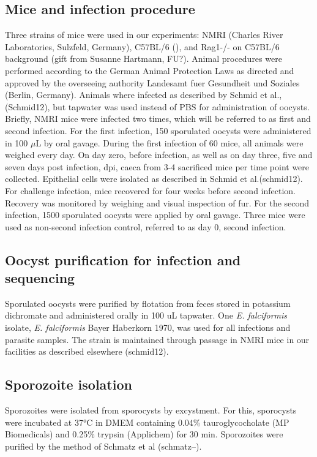 \documentclass{bmcart}
\begin{document}
\subsection{Mice and infection procedure}
Three strains of mice were used in our experiments: NMRI (Charles
River Laboratories, Sulzfeld, Germany), C57BL/6 (), and Rag1-/- on
C57BL/6 background (gift from Susanne Hartmann, FU?).  Animal
procedures were performed according to the German Animal Protection
Laws as directed and approved by the overseeing authority Landesamt
fuer Gesundheit und Soziales (Berlin, Germany). Animals where infected
as described by Schmid et al., (Schmid12), but tapwater was used
instead of PBS for administration of oocysts. Briefly, NMRI mice were
infected two times, which will be referred to as first and second
infection. For the first infection, 150 sporulated oocysts were
administered in 100 $μ$L by oral gavage. During the first infection of
60 mice, all animals were weighed every day. On day zero, before
infection, as well as on day three, five and seven days post
infection, dpi, caeca from 3-4 sacrificed mice per time point were
collected. Epithelial cells were isolated as described in Schmid et
al.(schmid12). For challenge infection, mice recovered for four weeks
before second infection.  Recovery was monitored by weighing and
visual inspection of fur. For the second infection, 1500 sporulated
oocysts were applied by oral gavage. Three mice were used as
non-second infection control, referred to as day 0, second infection.

\subsection{Oocyst purification for infection and sequencing}
Sporulated oocysts were purified by flotation from feces stored in
potassium dichromate and administered orally in 100 uL tapwater. One
\textit{E. falciformis} isolate, \textit{E. falciformis} Bayer
Haberkorn 1970, was used for all infections and parasite samples. The
strain is maintained through passage in NMRI mice in our facilities as
described elsewhere (schmid12).

\subsection{Sporozoite isolation}
Sporozoites were isolated from sporocysts by excystment. For this,
sporocysts were incubated at 37$°$C in DMEM containing 0.04\%
tauroglycocholate (MP Biomedicals) and 0.25\% trypsin (Applichem) for
30 min. Sporozoites were purified by the method of Schmatz et al
(schmatz--).
\end{document}
